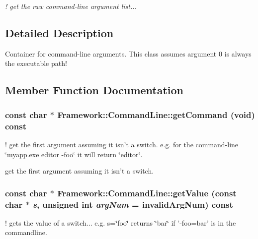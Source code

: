 \begin{DoxyCompactItemize}
\begin{DoxyCompactList}\small\item\em ! get the raw command-\/line argument list... \item\end{DoxyCompactList}\end{DoxyCompactItemize}


\subsection{Detailed Description}
Container for command-\/line arguments. This class assumes argument 0 is always the executable path! 

\subsection{Member Function Documentation}
\hypertarget{classFramework_1_1CommandLine_aeed4f667a73000dcbe25506af165f3bd}{
\subsubsection[{getCommand}]{\setlength{\rightskip}{0pt plus 5cm}const char $\ast$ Framework::CommandLine::getCommand (void) const}}
\label{classFramework_1_1CommandLine_aeed4f667a73000dcbe25506af165f3bd}
! get the first argument assuming it isn't a switch. e.g. for the command-\/line \char`\"{}myapp.exe editor -\/foo\char`\"{} it will return \char`\"{}editor\char`\"{}. 

get the first argument assuming it isn't a switch. \hypertarget{classFramework_1_1CommandLine_abf282e747032e7dd5b0648344f7608b8}{
\subsubsection[{getValue}]{\setlength{\rightskip}{0pt plus 5cm}const char $\ast$ Framework::CommandLine::getValue (const char $\ast$ {\em s}, \/  unsigned int {\em argNum} = {\ttfamily invalidArgNum}) const}}
\label{classFramework_1_1CommandLine_abf282e747032e7dd5b0648344f7608b8}
! gets the value of a switch... e.g. s=\char`\"{}foo\char`\"{} returns \char`\"{}bar\char`\"{} if '-\/foo=bar' is in the commandline. 

